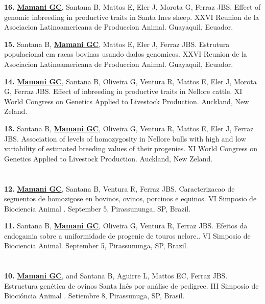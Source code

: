 \documentclass[margin,line,10pt]{res}
\newenvironment{list1}{
  \begin{list}{\ding{113}}{%
      \setlength{\itemsep}{0in}
      \setlength{\parsep}{0in} \setlength{\parskip}{0in}
      \setlength{\topsep}{0in} \setlength{\partopsep}{0in} 
      \setlength{\leftmargin}{0.17in}}}{\end{list}}
\begin{document}
\begin{resume}
\begin{list1}
\item [\bf{16}.] {\bf \underline{Mamani GC}}, Santana B, Mattos E, Eler J, Morota G, Ferraz JBS. Effect of genomic inbreeding in productive traits in Santa Ines sheep.
XXVI Reunion de la Asociacion Latinoamericana de Produccion Animal. Guayaquil, Ecuador. 
\vspace{0.5cm}
\item [\bf{15}.] Santana B, {\bf \underline{Mamani GC}}, Mattos E, Eler J, Ferraz JBS. 
Estrutura populacional em racas bovinas usando dados genomicos. 
XXVI Reunion de la Asociacion Latinoamericana de Produccion Animal. Guayaquil, Ecuador. 
\vspace{0.5cm}
\item [\bf{14}.] {\bf \underline{Mamani GC}}, Santana B, Oliveira G, Ventura R, Mattos E, Eler J, Morota G, Ferraz JBS. 
Effect of inbreeding in productive traits in Nellore cattle.
XI World Congress on Genetics Applied to Livestock Production. Auckland, New Zeland. 
\vspace{0.5cm}
\item [\bf{13}.] Santana B, {\bf \underline{Mamani GC}}, Oliveira G, Ventura R, Mattos E, Eler J, Ferraz JBS. 
Association of levels of homozygosity in Nellore bulls with high and low variability of estimated breeding values of their progenies.
XI World Congress on Genetics Applied to Livestock Production. Auckland, New Zeland. 
\end{list1}

\section{}
\begin{list1}
\item [\bf{12}.] {\bf \underline{Mamani GC}}, Santana B,  Ventura R, Ferraz JBS. 
Caracterizacao de segmentos de homozigose en bovinos, ovinos, porcinos e equinos.
VI Simposio de Biociencia Animal . September 5, Pirassununga, SP, Brazil. 
\vspace{0.5cm}
\item [\bf{11}.] Santana B, {\bf \underline{Mamani GC}}, Oliveira G,  Ventura R, Ferraz JBS. 
Efeitos da endogamia sobre a uniformidade de progenie de touros nelore..
VI Simposio de Biociencia Animal. September 5, Pirassununga, SP, Brazil. 
\end{list1}

\section{}
\begin{list1}
\item [\bf{10}.] {\bf \underline{Mamani GC}}, and Santana B, Aguirre L, Mattos EC, Ferraz JBS. 
Estructura genética de ovinos Santa Inês por análise de pedigree.
III Simposio de Biocióncia Animal . Setiembre 8, Pirassunuga, SP, Brasil. 
\end{list1}


\end{resume}
\end{document}
